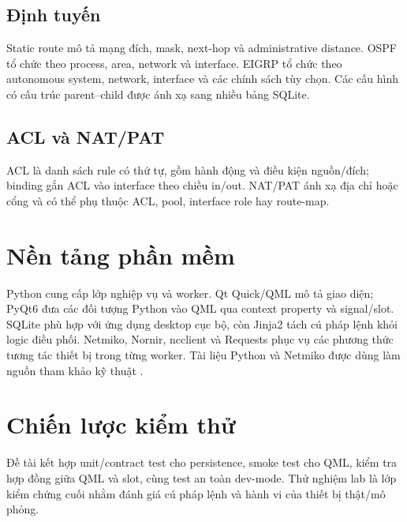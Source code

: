 \subsection{Định tuyến}

Static route mô tả mạng đích, mask, next-hop và administrative distance. OSPF tổ chức theo process, area, network và interface. EIGRP tổ chức theo autonomous system, network, interface và các chính sách tùy chọn. Các cấu hình có cấu trúc parent--child được ánh xạ sang nhiều bảng SQLite.

\subsection{ACL và NAT/PAT}

ACL là danh sách rule có thứ tự, gồm hành động và điều kiện nguồn/đích; binding gắn ACL vào interface theo chiều in/out. NAT/PAT ánh xạ địa chỉ hoặc cổng và có thể phụ thuộc ACL, pool, interface role hay route-map.

\section{Nền tảng phần mềm}

Python cung cấp lớp nghiệp vụ và worker. Qt Quick/QML mô tả giao diện; PyQt6 đưa các đối tượng Python vào QML qua context property và signal/slot. SQLite phù hợp với ứng dụng desktop cục bộ, còn Jinja2 tách cú pháp lệnh khỏi logic điều phối. Netmiko, Nornir, ncclient và Requests phục vụ các phương thức tương tác thiết bị trong từng worker. Tài liệu Python và Netmiko được dùng làm nguồn tham khảo kỹ thuật \cite{pythonDocs,netmikoDocs}.

\section{Chiến lược kiểm thử}

Đề tài kết hợp unit/contract test cho persistence, smoke test cho QML, kiểm tra hợp đồng giữa QML và slot, cùng test an toàn dev-mode. Thử nghiệm lab là lớp kiểm chứng cuối nhằm đánh giá cú pháp lệnh và hành vi của thiết bị thật/mô phỏng.
